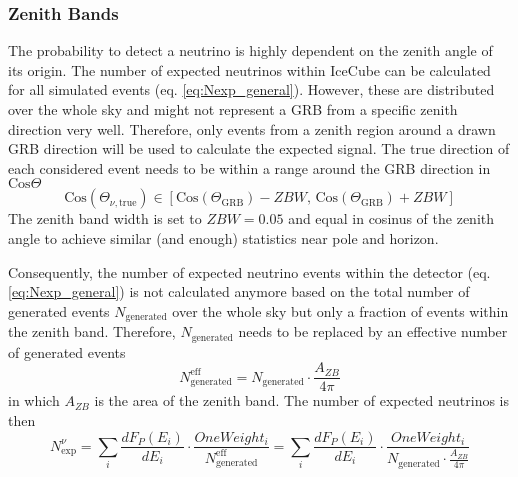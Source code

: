 \subsubsection{Zenith Bands}
\label{sec:zenith_bands}
The probability to detect a neutrino is highly dependent on the zenith angle of
its origin. The number of expected neutrinos within IceCube can be
calculated for all simulated events (eq. \ref{eq:Nexp_general}). However, these
are distributed over the whole sky and might not represent a GRB from a
specific zenith direction very well. Therefore, only events from a zenith 
region around
a drawn GRB direction will be used to calculate the expected signal. The true
direction of each considered event needs to be within a range around the GRB
direction in $\text{Cos} \Theta$
\begin{equation}
\text{Cos}\left(\Theta_{\nu, \text{true}}\right) \in
\left[\text{Cos}\left(\Theta_\text{GRB}\right) - ZBW,\,
\text{Cos}\left(\Theta_\text{GRB}\right) +
ZBW\right]
\end{equation}
The zenith band width is set to $ZBW = 0.05$ and equal in cosinus of the zenith
angle to achieve similar (and enough) statistics near pole and horizon. 


Consequently, the number of expected neutrino events within the detector (eq.
\ref{eq:Nexp_general}) is not calculated anymore based on the total number of
generated events $N_\text{generated}$ over the whole sky but only a fraction of
events within the zenith band. Therefore, $N_\text{generated}$ needs to be
replaced by an effective number of generated events
\begin{equation}
N_\text{generated}^\text{eff} = N_\text{generated} \cdot \frac{A_{ZB}}{4\pi}
\end{equation}
in which $A_{ZB}$ is the area of the zenith band. The number of expected
neutrinos is then 
\begin{equation}
\label{eq:Nexp_wZB}
 N_\text{exp}^\nu = \sum_i\frac{dF_P(E_i)}{dE_i} \cdot
\frac{OneWeight_i}{N_\text{generated}^\text{eff}} = 
\sum_i\frac{dF_P(E_i)}{dE_i} \cdot
\frac{OneWeight_i}{N_\text{generated} \cdot \frac{A_{ZB}}{4\pi}}
\end{equation}